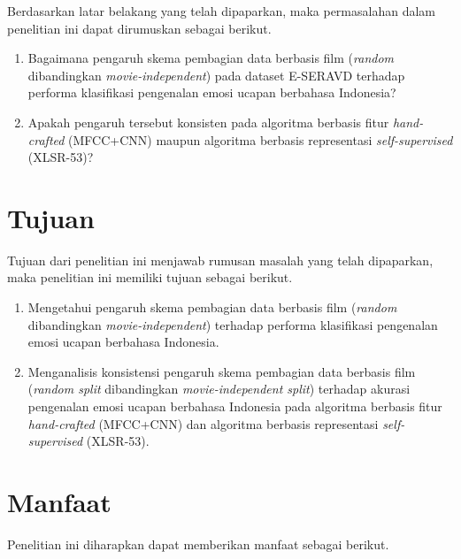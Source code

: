 Berdasarkan latar belakang yang telah dipaparkan, maka permasalahan
dalam penelitian ini dapat dirumuskan sebagai berikut.

\begin{enumerate}
  \item Bagaimana pengaruh skema pembagian data berbasis film
        (\emph{random} dibandingkan \emph{movie-independent}) pada dataset E-SERAVD terhadap
        performa klasifikasi pengenalan emosi ucapan berbahasa
        Indonesia?
  \item Apakah pengaruh tersebut konsisten pada algoritma berbasis
        fitur \emph{hand-crafted} (MFCC+CNN) maupun algoritma berbasis representasi
        \emph{self-supervised} (XLSR-53)?
\end{enumerate}

\section{Tujuan}
\label{sec:1.3}

Tujuan dari penelitian ini menjawab rumusan masalah yang telah
dipaparkan, maka penelitian ini memiliki tujuan sebagai berikut.

\begin{enumerate}
  \item Mengetahui pengaruh skema pembagian data berbasis film
        (\emph{random} dibandingkan \emph{movie-independent}) terhadap
        performa klasifikasi pengenalan emosi ucapan berbahasa
        Indonesia.
  \item Menganalisis konsistensi pengaruh skema pembagian data berbasis
        film (\emph{random split} dibandingkan \emph{movie-independent
        split}) terhadap akurasi pengenalan emosi ucapan berbahasa
        Indonesia pada algoritma berbasis fitur \emph{hand-crafted} (MFCC+CNN) dan
        algoritma berbasis representasi \emph{self-supervised} (XLSR-53).
\end{enumerate}

\section{Manfaat}
\label{sec:1.4}

Penelitian ini diharapkan dapat memberikan manfaat sebagai berikut.

